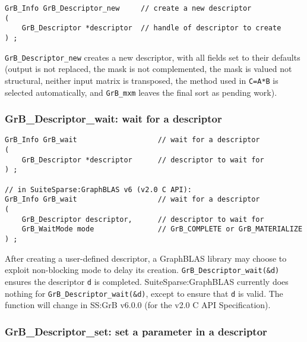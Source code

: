 \documentclass[12pt]{article}
\begin{document}
\begin{mdframed}[userdefinedwidth=6in]
{\footnotesize
\begin{verbatim}
GrB_Info GrB_Descriptor_new     // create a new descriptor
(
    GrB_Descriptor *descriptor  // handle of descriptor to create
) ;
\end{verbatim} } \end{mdframed}

\verb'GrB_Descriptor_new' creates a new descriptor, with all fields set to
their defaults (output is not replaced, the mask is not complemented, the mask
is valued not structural, neither input matrix is transposed, the method
used in \verb'C=A*B' is selected automatically, and \verb'GrB_mxm' leaves
the final sort as pending work).

\subsubsection{{\sf GrB\_Descriptor\_wait:} wait for a descriptor}
\label{descriptor_wait}

\begin{mdframed}[userdefinedwidth=6in]
{\footnotesize
\begin{verbatim}
GrB_Info GrB_wait                   // wait for a descriptor
(
    GrB_Descriptor *descriptor      // descriptor to wait for
) ;

// in SuiteSparse:GraphBLAS v6 (v2.0 C API):
GrB_Info GrB_wait                   // wait for a descriptor
(
    GrB_Descriptor descriptor,      // descriptor to wait for
    GrB_WaitMode mode               // GrB_COMPLETE or GrB_MATERIALIZE
) ;
\end{verbatim}
}\end{mdframed}

After creating a user-defined descriptor, a GraphBLAS library may choose to
exploit non-blocking mode to delay its creation.
\verb'GrB_Descriptor_wait(&d)' ensures the descriptor \verb'd' is completed.
SuiteSparse:GraphBLAS currently does nothing for
\verb'GrB_Descriptor_wait(&d)', except to ensure that \verb'd' is valid.
The function will change in SS:GrB v6.0.0 (for the v2.0 C API Specification).

\newpage
\subsubsection{{\sf GrB\_Descriptor\_set:}  set a parameter in a descriptor}
\label{descriptor_set}
\end{document}
